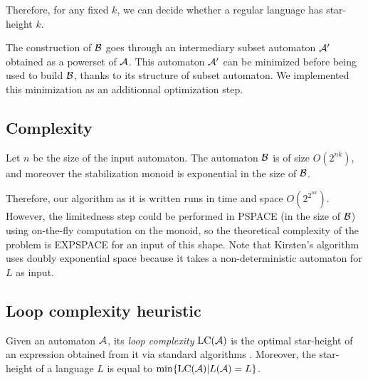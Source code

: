 Therefore, for any fixed $k$, we can decide whether a regular language has star-height $k$.

The construction of $\mathcal B$ goes through an intermediary subset automaton $\mathcal{A}'$ obtained as a powerset of $\mathcal{A}$. This automaton $\mathcal{A}'$ can be minimized before being used to build $\mathcal B$, thanks to its structure of subset automaton.
We implemented this minimization as an additionnal optimization step.
%




\subsection{Complexity}

Let $n$ be the size of the input automaton.
The automaton $\mathcal B$ is of size $O(2^{nk})$, and moreover the stabilization monoid is exponential in the size of $\mathcal B$.

Therefore, our algorithm as it is written runs in time and space $O(2^{2^{nk}})$. However, the limitedness step could be performed in PSPACE (in the size of $\mathcal B$) using on-the-fly computation on the monoid, 
so the theoretical complexity of the problem is EXPSPACE for an input of this shape. 
Note that Kirsten's algorithm uses doubly exponential space because it takes a non-deterministic automaton for $L$ as input.

\subsection{Loop complexity heuristic}

\newcommand{\lc}{\mathrm{LC}}

Given an automaton $\mathcal{A}$, its \emph{loop complexity} $\lc(\A)$ is the optimal star-height of an expression obtained from it via standard algorithms \cite{Eggan63}. Moreover, the star-height of a language $L$ is equal to $\min\{\lc(\A)| L(\A)=L\}$.

